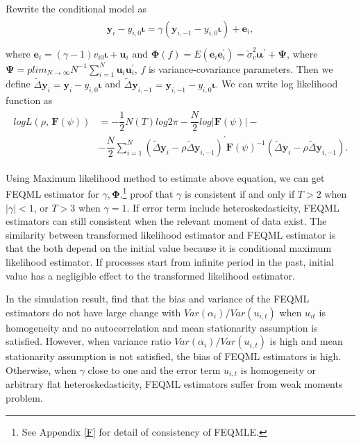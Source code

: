 \documentclass[12pt,a4paper,hyperref]{article}
\begin{document}
Rewrite the conditional model as
\begin{align}
\begin{split}
\boldsymbol{y}_{i}-y_{i,0}\boldsymbol{\iota}=\gamma \left( \boldsymbol{y}_{i,-1}-y_{i,0}\boldsymbol{\iota}  \right)+\boldsymbol{e}_{i},\\
\end{split}
\end{align}
where $\boldsymbol{e}_{i}=\left( \gamma-1 \right)v_{i0}\boldsymbol{\iota}+\boldsymbol{u}_{i}$ and  $\boldsymbol{\Phi}\left( f\right)=E(\boldsymbol{e}_{i}\boldsymbol{e}_{i}^{'})=\tilde{\sigma}^{2}_{v}\boldsymbol{\iota}\boldsymbol{\iota}^{'}+\boldsymbol{\Psi}$, where $\boldsymbol{\Psi}=plim_{N\rightarrow\infty}N^{-1}\sum^{N}_{i=1}\boldsymbol{u}_{i}\boldsymbol{u}_{i}^{'}$, $f$ is variance-covariance parameters. Then we define $\tilde{\Delta}\boldsymbol{y}_{i}=\boldsymbol{y}_{i}-y_{i,0}\boldsymbol{\iota}$ and $\tilde{\Delta}\boldsymbol{y}_{i,-1}=\boldsymbol{y}_{i,-1}-y_{i,0}\boldsymbol{\iota}$.
We can write log likelihood function as
\begin{align}
\begin{split}
logL \left(\rho,\,\boldsymbol{F}\left(\psi \right) \right)&=-\dfrac{1}{2}N(T)log2\pi-\dfrac{N}{2}log | \boldsymbol{F}\left(\psi \right) |- \\
&-\dfrac{N}{2}\sum^{N}_{i=1}(\tilde{\Delta}\boldsymbol{y}_{i}-\rho\tilde{\Delta}\boldsymbol{y}_{i,-1})^{'}\boldsymbol{F}\left(\psi \right)^{-1}(\tilde{\Delta}\boldsymbol{y}_{i}-\rho\tilde{\Delta}\boldsymbol{y}_{i,-1}).
\end{split}
\end{align}

Using Maximum likelihood method to estimate above equation, we can get FEQML estimator for $\gamma, \boldsymbol{\Phi}$.\footnote{See Appendix \ref{F} for detail of consistency of FEQMLE.} \citet{Kruiniger:2013} proof that $\gamma$ is consistent if and only if $T >2$ when $|\gamma|<1$, or $T>3$ when $\gamma=1$.
If error term include heteroskedasticity, FEQML estimators can still consistent when the relevant moment of data exist. The similarity between transformed likelihood estimator and FEQML estimator is that the both depend on the initial value because it is conditional maximum likelihood estimator. If processes start from infinite period in the past, initial value has a negligible effect to the transformed likelihood estimator.

In the simulation result, \citet{Kruiniger:2013} find that the bias and variance of the FEQML estimators do not have large change with $Var(\alpha_{i})/Var(u_{i,t})$ when $u_{it}$ is homogeneity and no autocorrelation and mean stationarity assumption is satisfied. However, when variance ratio $Var(\alpha_{i})/Var(u_{i,t})$ is high and mean stationarity assumption is not satisfied, the bias of FEQML estimators is high. Otherwise, when $\gamma$ close to one and the error term $u_{i,t}$ is homogeneity or arbitrary flat heteroskedasticity, FEQML estimators suffer from weak moments problem.
\end{document}
